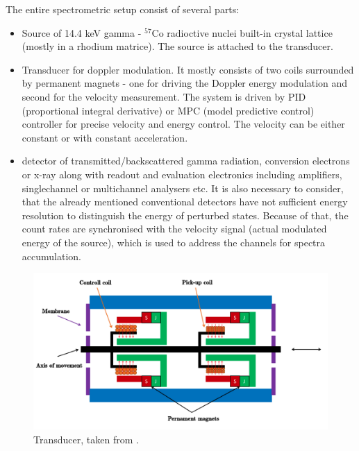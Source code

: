 The entire spectrometric setup consist of several parts:
\begin{itemize}

\item Source of 14.4 keV gamma - $^{57}$Co radioctive nuclei built-in crystal lattice (mostly in a rhodium matrice). The source is attached to the transducer.
\item Transducer for doppler modulation. It mostly consists of two coils surrounded by permanent magnets - one for driving the Doppler energy modulation and second for the velocity measurement. The system is driven by PID (proportional integral derivative) or MPC (model predictive control) controller for precise velocity and energy control. The velocity can be either constant or with constant acceleration.

\item detector of transmitted/backscattered gamma radiation, conversion electrons or x-ray along with readout and evaluation electronics including amplifiers, singlechannel or multichannel analysers etc. It is also necessary to consider, that the already mentioned conventional detectors have not sufficient energy resolution to distinguish the energy of perturbed states. Because of that, the count rates are synchronised with the velocity signal (actual modulated energy of the source), which is used to address the channels for spectra accumulation. 

\end{itemize}

\begin{figure}[H]
 \centering
 \includegraphics[scale=0.4, angle = 0]{./pictures/transducer}
 \caption{Transducer, taken from \cite{STEJSKAL2019thesis}.}
 \label{transducer}
 
\end{figure}


